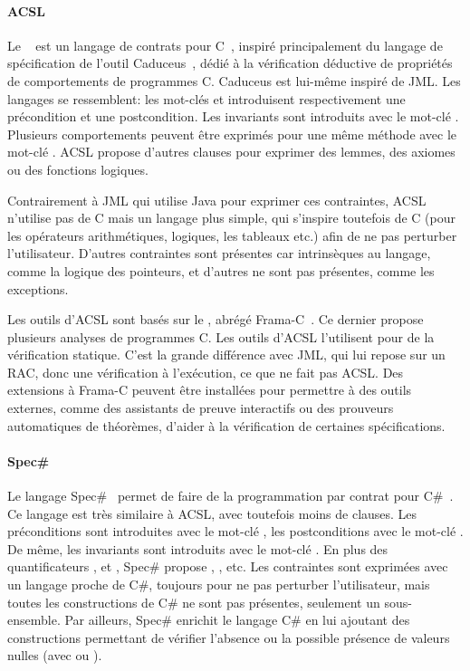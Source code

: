 \paragraph{ACSL} Le ~
est un langage de contrats pour C~, inspiré principalement du langage
de spécification de l'outil Caduceus~, dédié à la
vérification déductive de propriétés de comportements de programmes C. Caduceus
est lui-même inspiré de JML. Les langages se ressemblent: les mot-clés
 et  introduisent respectivement une précondition
et une postcondition. Les invariants sont introduits avec le mot-clé
.  Plusieurs comportements peuvent être exprimés pour une même
méthode avec le mot-clé . ACSL propose d'autres clauses pour
exprimer des lemmes, des axiomes ou des fonctions logiques.

Contrairement à JML qui utilise Java pour exprimer ces contraintes, ACSL
n'utilise pas de C mais un langage plus simple, qui s'inspire toutefois de C
(pour les opérateurs arithmétiques, logiques, les tableaux etc.) afin de ne pas
perturber l'utilisateur. D'autres contraintes sont présentes car intrinsèques au
langage, comme la logique des pointeurs, et d'autres ne sont pas présentes,
comme les exceptions.

Les outils d'ACSL sont basés sur le , abrégé Frama-C~. Ce dernier propose plusieurs analyses de
programmes C. Les outils d'ACSL l'utilisent pour de la vérification statique.
C'est la grande différence avec JML, qui lui repose sur un RAC, donc une
vérification à l'exécution, ce que ne fait pas ACSL. Des extensions à Frama-C
peuvent être installées pour permettre à des outils externes, comme des
assistants de preuve interactifs ou des prouveurs automatiques de théorèmes,
d'aider à la vérification de certaines spécifications.

\paragraph{Spec\#} Le langage Spec\#~ permet de faire de la
programmation par contrat pour C\#~. Ce langage est très similaire
à ACSL, avec toutefois moins de clauses. Les préconditions sont introduites avec
le mot-clé , les postconditions avec le mot-clé .
De même, les invariants sont introduits avec le mot-clé . En
plus des quantificateurs ,  et ,
Spec\# propose , ,  etc. Les contraintes sont
exprimées avec un langage proche de C\#, toujours pour ne pas perturber
l'utilisateur, mais toutes les constructions de C\# ne sont pas présentes,
seulement un sous-ensemble.  Par ailleurs, Spec\# enrichit le langage C\# en lui
ajoutant des constructions permettant de vérifier l'absence ou la possible
présence de valeurs nulles (avec \code{!} ou ).

